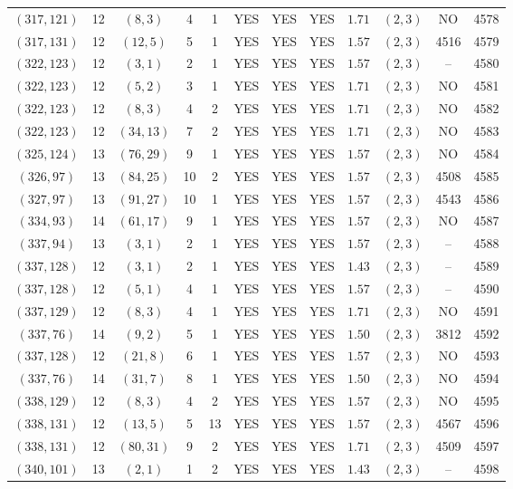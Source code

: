 \begin{longtable}{|c|c|c|c|c|c|c|c|c|c|c|c|}
$(317,121)$ & 12 & $(8,3)$ & 4 & 1 & YES & YES & YES & $1.71$ & $(2,3)$ & NO & 4578\\
$(317,131)$ & 12 & $(12,5)$ & 5 & 1 & YES & YES & YES & $1.57$ & $(2,3)$ & 4516 & 4579\\
$(322,123)$ & 12 & $(3,1)$ & 2 & 1 & YES & YES & YES & $1.57$ & $(2,3)$ & -- & 4580\\
$(322,123)$ & 12 & $(5,2)$ & 3 & 1 & YES & YES & YES & $1.71$ & $(2,3)$ & NO & 4581\\
$(322,123)$ & 12 & $(8,3)$ & 4 & 2 & YES & YES & YES & $1.71$ & $(2,3)$ & NO & 4582\\
$(322,123)$ & 12 & $(34,13)$ & 7 & 2 & YES & YES & YES & $1.71$ & $(2,3)$ & NO & 4583\\
$(325,124)$ & 13 & $(76,29)$ & 9 & 1 & YES & YES & YES & $1.57$ & $(2,3)$ & NO & 4584\\
$(326,97)$ & 13 & $(84,25)$ & 10 & 2 & YES & YES & YES & $1.57$ & $(2,3)$ & 4508 & 4585\\
$(327,97)$ & 13 & $(91,27)$ & 10 & 1 & YES & YES & YES & $1.57$ & $(2,3)$ & 4543 & 4586\\
$(334,93)$ & 14 & $(61,17)$ & 9 & 1 & YES & YES & YES & $1.57$ & $(2,3)$ & NO & 4587\\
$(337,94)$ & 13 & $(3,1)$ & 2 & 1 & YES & YES & YES & $1.57$ & $(2,3)$ & -- & 4588\\
$(337,128)$ & 12 & $(3,1)$ & 2 & 1 & YES & YES & YES & $1.43$ & $(2,3)$ & -- & 4589\\
$(337,128)$ & 12 & $(5,1)$ & 4 & 1 & YES & YES & YES & $1.57$ & $(2,3)$ & -- & 4590\\
$(337,129)$ & 12 & $(8,3)$ & 4 & 1 & YES & YES & YES & $1.71$ & $(2,3)$ & NO & 4591\\
$(337,76)$ & 14 & $(9,2)$ & 5 & 1 & YES & YES & YES & $1.50$ & $(2,3)$ & 3812 & 4592\\
$(337,128)$ & 12 & $(21,8)$ & 6 & 1 & YES & YES & YES & $1.57$ & $(2,3)$ & NO & 4593\\
$(337,76)$ & 14 & $(31,7)$ & 8 & 1 & YES & YES & YES & $1.50$ & $(2,3)$ & NO & 4594\\
$(338,129)$ & 12 & $(8,3)$ & 4 & 2 & YES & YES & YES & $1.57$ & $(2,3)$ & NO & 4595\\
$(338,131)$ & 12 & $(13,5)$ & 5 & 13 & YES & YES & YES & $1.57$ & $(2,3)$ & 4567 & 4596\\
$(338,131)$ & 12 & $(80,31)$ & 9 & 2 & YES & YES & YES & $1.71$ & $(2,3)$ & 4509 & 4597\\
$(340,101)$ & 13 & $(2,1)$ & 1 & 2 & YES & YES & YES & $1.43$ & $(2,3)$ & -- & 4598\\

\end{longtable}
